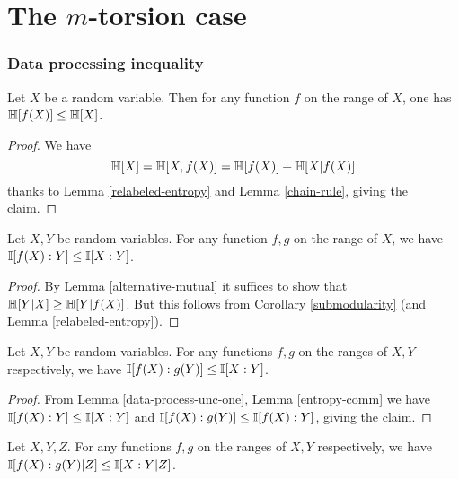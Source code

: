 \chapter{The $m$-torsion case}

\subsection{Data processing inequality}

\begin{lemma}\label{data-process-single}  Let $X$ be a random variable.  Then for any function $f$ on the range of $X$, one has $\mathbb{H}[f(X)] \leq \mathbb{H}[X]$.
\end{lemma}

\begin{proof}
We have
$$ \mathbb{H}[X] = \mathbb{H}[X,f(X)] = \mathbb{H}[f(X)] + \mathbb{H}[X|f(X)]$$
thanks to Lemma \ref{relabeled-entropy} and Lemma \ref{chain-rule}, giving the claim.
\end{proof}

\begin{lemma}\label{data-process-unc-one} Let $X,Y$ be random variables. For any function $f, g$ on the range of $X$, we have $\mathbb{I}[f(X) : Y] \leq \mathbb{I}[X:Y]$.
\end{lemma}

\begin{proof}
  By Lemma \ref{alternative-mutual} it suffices to show that $\mathbb{H}[Y|X] \geq \mathbb{H}[Y|f(X)]$. But this follows from Corollary \ref{submodularity} (and Lemma \ref{relabeled-entropy}).
\end{proof}

\begin{lemma}\label{data-process-unc} Let $X,Y$ be random variables. For any functions $f, g$ on the ranges of $X, Y$ respectively, we have $\mathbb{I}[f(X) : g(Y )] \leq \mathbb{I}[X : Y]$.
\end{lemma}

\begin{proof}
   From Lemma \ref{data-process-unc-one}, Lemma \ref{entropy-comm} we have $\mathbb{I}[f(X) : Y] \leq \mathbb{I}[X:Y]$ and $\mathbb{I}[f(X): g(Y)] \leq \mathbb{I}[f(X):Y]$, giving the claim.
\end{proof}

\begin{lemma}\label{data-process} Let $X,Y,Z$. For any functions $f, g$
on the ranges of $X, Y$ respectively, we have $\mathbb{I}[f(X) : g(Y )|Z] \leq \mathbb{I}[X :Y |Z]$.
\end{lemma}

